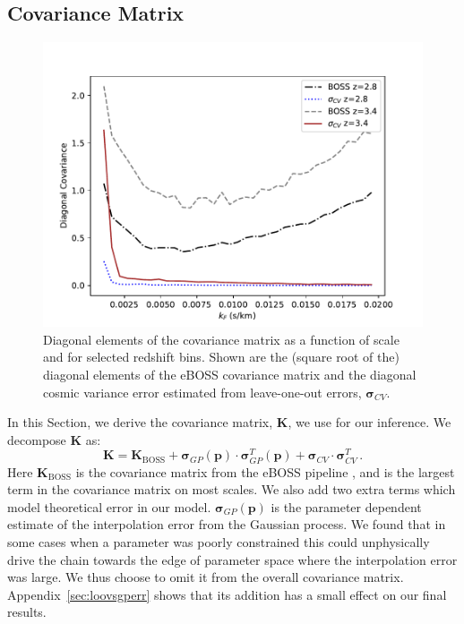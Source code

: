 
\subsection{Covariance Matrix}
\label{sec:theoryerror}

\begin{figure}
    \centering
    \includegraphics[width=\textwidth]{figures/errors_loo.pdf}
    \caption{\label{fig:covariance_loo}
    Diagonal elements of the covariance matrix as a function of scale and for selected redshift bins. Shown are the (square root of the) diagonal elements of the eBOSS covariance matrix and the diagonal cosmic variance error estimated from leave-one-out errors, $\boldsymbol{\sigma}_{CV}$.}
\end{figure}

In this Section, we derive the covariance matrix, $\boldsymbol{K}$, we use for our inference. We decompose $\boldsymbol{K}$ as:
\begin{equation}
    \boldsymbol{K} = \boldsymbol{K}_\mathrm{BOSS} + \boldsymbol{\sigma}_{GP}(\boldsymbol{p}) \cdot \boldsymbol{\sigma}_{GP}^T (\boldsymbol{p}) + \boldsymbol{\sigma}_{CV} \cdot \boldsymbol{\sigma}_{CV}^T \,.
    \label{eq:covariance}
\end{equation}
Here $\boldsymbol{K}_\mathrm{BOSS}$ is the covariance matrix from the eBOSS pipeline \cite{2019JCAP...07..017C}, and is the largest term in the covariance matrix on most scales. We also add two extra terms which model theoretical error in our model. 
$\boldsymbol{\sigma}_{GP}(\boldsymbol{p})$ is the parameter dependent estimate of the interpolation error from the Gaussian process. We found that in some cases when a parameter was poorly constrained this could unphysically drive the chain towards the edge of parameter space where the interpolation error was large. We thus choose to omit it from the overall covariance matrix. Appendix~\ref{sec:loovsgperr} shows that its addition has a small effect on our final results.

